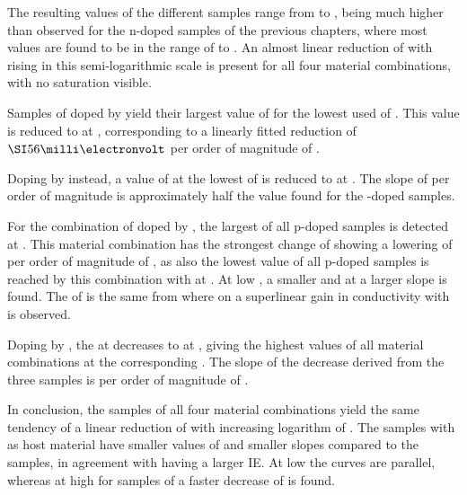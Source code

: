 The resulting values of the different samples range from \Eact[204] to , being much higher than observed for the n-doped samples of the previous chapters, where most values are found to be in the range of \Eact[50] to .
An almost linear reduction of \Eact with rising \CLong in this semi-logarithmic scale is present for all four material combinations, with no saturation visible.

Samples of \meo doped by \FS yield their largest value of \Eact[312] for the lowest used \CLong of \C[0.004]. This value is reduced to \Eact[211] at \C[0.290], corresponding to a linearly fitted reduction of $\meV{56}$ per order of magnitude of \C.

Doping \meo by \CSF instead, a value of \Eact[333] at the lowest \CLong of  is reduced to \Eact[279] at . The slope of  per order of magnitude is approximately half the value found for the \FS-doped samples.

For the combination of \lili doped by \FS, the largest \Eact[374] of all p-doped samples is detected at \C[0.010]. This material combination has the strongest change of \Eact showing a lowering of  per order of magnitude of \C, as also the lowest value of all p-doped samples is reached by this combination with \Eact[204] at \C[0.490]. At low \CLongs, a smaller and at  a larger slope is found. The \CLong of  is the same from where on a superlinear gain in conductivity with \C is observed.

Doping \lili by \CSF, the \Eact[346] at \C[0.056] decreases to  at , giving the highest values of all material combinations at the corresponding \CLong. The slope of the decrease derived from the three samples is  per order of magnitude of \C.

In conclusion, the samples of all four material combinations yield the same tendency of a linear reduction of \Eact with increasing logarithm of \C. The samples with \meo as host material have smaller values of \Eact and smaller slopes compared to the \lili samples, in agreement with \lili having a larger IE. At low \C the curves are parallel, whereas at high \C for samples of \lili a faster decrease of \Eact is found.

